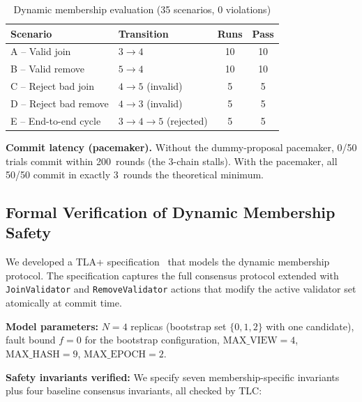 \documentclass{SVProc}
\begin{document}
\begin{table}[t]
\caption{Dynamic membership evaluation (35 scenarios, 0 violations)}
\centering
\begin{tabular}{llcc}
\toprule
\textbf{Scenario} & \textbf{Transition} & \textbf{Runs} & \textbf{Pass} \\
\midrule
A -- Valid join       & $3 \to 4$          & 10 & 10 \\
B -- Valid remove     & $5 \to 4$          & 10 & 10 \\
C -- Reject bad join  & $4 \to 5$ (invalid)& 5  & 5  \\
D -- Reject bad remove& $4 \to 3$ (invalid)& 5  & 5  \\
E -- End-to-end cycle & $3{\to}4{\to}5$ (rejected)& 5  & 5  \\
\bottomrule
\end{tabular}
\label{tab:membership}
\end{table}

\smallskip\noindent\textbf{Commit latency (pacemaker).}\quad
Without the dummy-proposal pacemaker, 0/50 trials commit within 200~rounds
(the 3-chain stalls).  With the pacemaker, all 50/50 commit in exactly
3~rounds the theoretical minimum.

\subsection{Formal Verification of Dynamic Membership Safety}
\label{sec:formal_verification}

We developed a TLA+ specification~\cite{lamport2002tla+} that models the dynamic membership protocol. The specification captures the full consensus protocol extended with \texttt{JoinValidator} and \texttt{RemoveValidator} actions that modify the active validator set atomically at commit time.

\smallskip\noindent\textbf{Model parameters:}\quad
$N{=}4$ replicas (bootstrap set $\{0,1,2\}$ with one candidate), fault
bound $f{=}0$ for the bootstrap configuration, $\text{MAX\_VIEW}{=}4$,
$\text{MAX\_HASH}{=}9$, $\text{MAX\_EPOCH}{=}2$.

\smallskip\noindent\textbf{Safety invariants verified:}\quad
We specify seven membership-specific invariants plus four baseline
consensus invariants, all checked by TLC:
\end{document}
